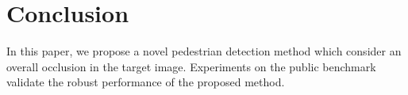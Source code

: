 \documentclass[10pt,twocolumn,letterpaper]{article}
\begin{document}




\section{Conclusion}
\label{sec:conclusion}
In this paper, we propose a novel pedestrian detection method which consider an overall occlusion in the target image.
Experiments on the public benchmark validate the robust performance of the proposed method.







{\small


}
\end{document}
